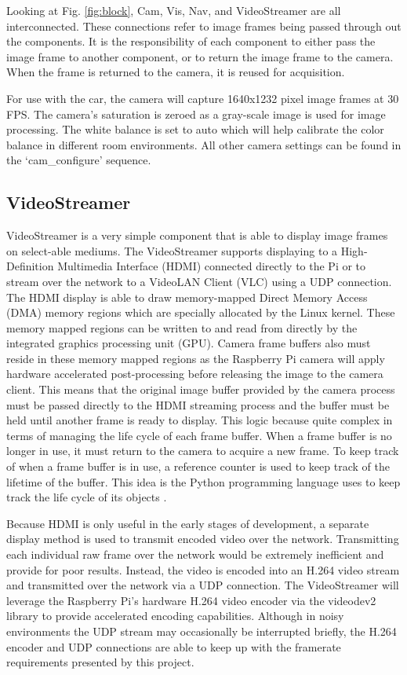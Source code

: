 \documentclass{article}
\begin{document}
Looking at Fig. \ref{fig:block}, Cam, Vis, Nav, and VideoStreamer are all
interconnected. These connections refer to image frames being passed through out
the components. It is the responsibility of each component to either pass the
image frame to another component, or to return the image frame to the camera. When
the frame is returned to the camera, it is reused for acquisition.

For use with the car, the camera will capture 1640x1232 pixel image frames at 30 FPS. The camera's saturation is zeroed as a gray-scale image is used for image processing. The white balance is set to auto which will help calibrate the color balance in different room environments. All other camera settings can be found in the `cam\_configure' sequence.

\subsection{VideoStreamer}

VideoStreamer is a very simple component that is able to display image frames on select-able mediums. The VideoStreamer supports displaying to a High-Definition Multimedia Interface (HDMI) connected directly to the Pi or to stream over the network to a VideoLAN Client (VLC) using a UDP connection. The HDMI display is able to draw memory-mapped Direct Memory Access (DMA) memory regions which are specially allocated by the Linux kernel. These memory mapped regions can be written to and read from directly by the integrated graphics processing unit (GPU). Camera frame buffers also must reside in these memory mapped regions as the Raspberry Pi camera will apply hardware accelerated post-processing before releasing the image to the camera client. This means that the original image buffer provided by the camera process must be passed directly to the HDMI streaming process and the buffer must be held until another frame is ready to display. This logic because quite complex in terms of managing the life cycle of each frame buffer. When a frame buffer is no longer in use, it must return to the camera to acquire a new frame. To keep track of when a frame buffer is in use, a reference counter is used to keep track of the lifetime of the buffer. This idea is the Python programming language uses to keep track the life cycle of its objects \cite{c7}.

Because HDMI is only useful in the early stages of development, a separate display method is used to transmit encoded video over the network. Transmitting each individual raw frame over the network would be extremely inefficient and provide for poor results. Instead, the video is encoded into an H.264 video stream and transmitted over the network via a UDP connection. The VideoStreamer will leverage the Raspberry Pi's hardware H.264 video encoder via the videodev2 library to provide accelerated encoding capabilities. Although in noisy environments the UDP stream may occasionally be interrupted briefly, the H.264 encoder and UDP connections are able to keep up with the framerate requirements presented by this project.
\end{document}

